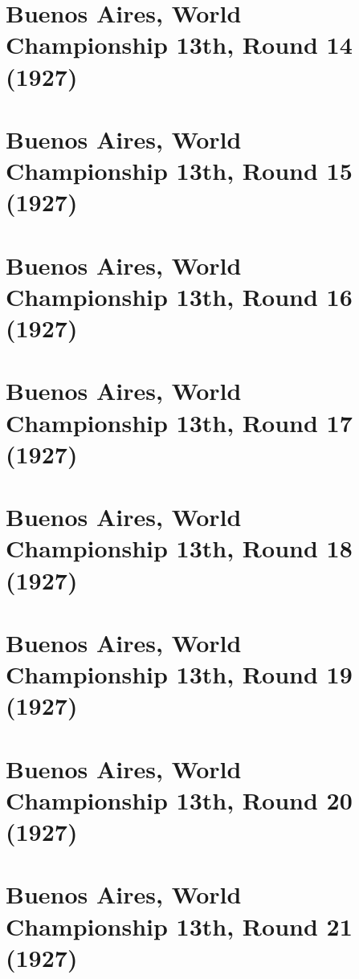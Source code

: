 \documentclass[11pt]{article}
\begin{document}
\clearpage

\section{Buenos Aires, World Championship 13th, Round 14 (1927)}


\clearpage

\section{Buenos Aires, World Championship 13th, Round 15 (1927)}


\clearpage

\section{Buenos Aires, World Championship 13th, Round 16 (1927)}


\clearpage

\section{Buenos Aires, World Championship 13th, Round 17 (1927)}


\clearpage

\section{Buenos Aires, World Championship 13th, Round 18 (1927)}


\clearpage

\section{Buenos Aires, World Championship 13th, Round 19 (1927)}


\clearpage

\section{Buenos Aires, World Championship 13th, Round 20 (1927)}


\clearpage

\section{Buenos Aires, World Championship 13th, Round 21 (1927)}

\end{document}
